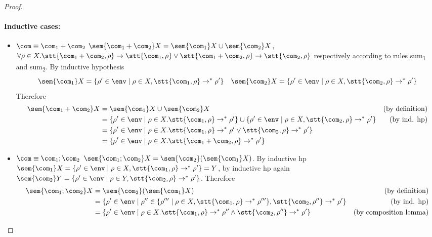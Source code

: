 \begin{proof}
  \paragraph*{Inductive cases:\\}
  \begin{itemize}
  \item \(\com \equiv \com_1 + \com_2\) \newline
    \(\sem{\com_1 + \com_2}X = \sem{\com_1}X \cup \sem{\com_2}X\),
    \(\forall \rho \in X . \stt{\com_1 + \com_2, \rho} \to
    \stt{\com_1, \rho} \vee \stt{\com_1 + \com_2, \rho} \to
    \stt{\com_2, \rho}\) respectively according to rules
    sum\textsubscript{1} and sum\textsubscript{2}. By inductive
    hypothesis
    \[\sem{\com_1}X = \{\rho' \in\env \mid \rho \in X ,
      \stt{\com_1,\rho} \to^* \rho'\} \quad \sem{\com_2}X = \{\rho'
      \in\env \mid \rho \in X , \stt{\com_2,\rho} \to^* \rho'\}\]
    Therefore
    \begin{align*}
      \sem{\com_1 + \com_2}X & = \sem{\com_1}X \cup \sem{\com_2}X & \text{(by definition)}\\
      & = \{\rho' \in\env \mid \rho \in X . \stt{\com_1,\rho} \to^* \rho'\} \cup \{\rho' \in\env \mid \rho \in X , \stt{\com_2,\rho} \to^* \rho'\} & \text{(by ind. hp)}\\
      & = \{\rho' \in\env \mid \rho \in X . \stt{\com_1,\rho} \to^* \rho' \vee \stt{\com_2,\rho} \to^* \rho'\} \\
      & = \{\rho' \in\env \mid \rho \in X . \stt{\com_1 + \com_2, \rho} \to^* \rho'\}
    \end{align*}
  \item \(\com \equiv \com_1;\com_2\) \newline
    \(\sem{\com_1;\com_2}X = \sem{\com_2}(\sem{\com_1}X)\). By inductive hp
    \(\sem{\com_1}X = \{\rho' \in\env \mid \rho \in X, \stt{\com_1,
      \rho} \to^* \rho'\} = Y\), by inductive hp again
    \(\sem{\com_2}Y = \{\rho' \in\env \mid \rho \in Y, \stt{\com_2,
      \rho} \to^* \rho'\}\). Therefore
    \begin{align*}
      \sem{\com_1;\com_2}X & = \sem{\com_2}(\sem{\com_1}X) & \text{(by definition)}\\
      & = \{\rho' \in\env \mid \rho'' \in \{\rho''' \mid \rho \in X, \stt{\com_1, \rho}  \to^* \rho'''\}, \stt{\com_2, \rho''} \to^* \rho'\} & \text{(by ind. hp)}\\
      & = \{\rho' \in\env \mid \rho \in X . \stt{\com_1, \rho} \to^* \rho'' \wedge \stt{\com_2, \rho''} \to^* \rho'\} & \text{(by composition lemma)}\\

\end{align*}
\end{itemize}
\end{proof}
